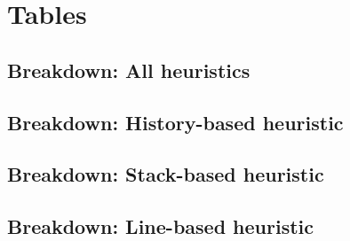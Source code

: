 \documentclass[sigplan,screen]{acmart}\settopmatter{printfolios=true,printccs=false,printacmref=false}
\begin{document}


\appendix

\section{Tables}
\subsection{Breakdown: All heuristics}

\subsection{Breakdown: History-based heuristic}

\subsection{Breakdown: Stack-based heuristic}

\subsection{Breakdown: Line-based heuristic}

\end{document}
